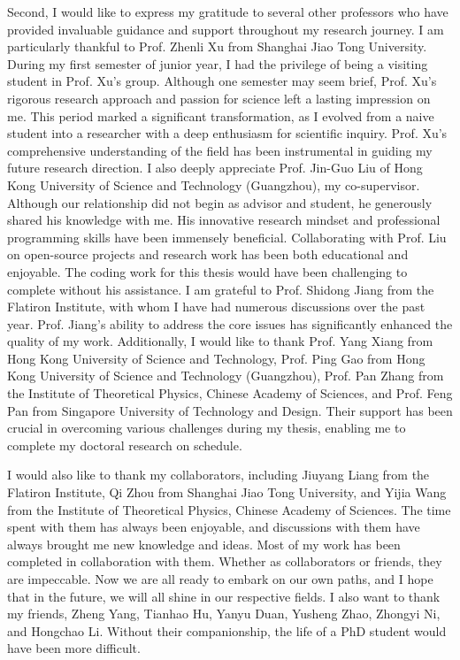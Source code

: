 Second, I would like to express my gratitude to several other professors who have provided invaluable guidance and support throughout my research journey. 
I am particularly thankful to Prof. Zhenli Xu from Shanghai Jiao Tong University. 
During my first semester of junior year, I had the privilege of being a visiting student in Prof. Xu's group.
Although one semester may seem brief, Prof. Xu's rigorous research approach and passion for science left a lasting impression on me. 
This period marked a significant transformation, as I evolved from a naive student into a researcher with a deep enthusiasm for scientific inquiry. Prof. Xu's comprehensive understanding of the field has been instrumental in guiding my future research direction.
I also deeply appreciate Prof. Jin-Guo Liu of Hong Kong University of Science and Technology (Guangzhou), my co-supervisor. 
Although our relationship did not begin as advisor and student, he generously shared his knowledge with me. His innovative research mindset and professional programming skills have been immensely beneficial. 
Collaborating with Prof. Liu on open-source projects and research work has been both educational and enjoyable. The coding work for this thesis would have been challenging to complete without his assistance.
I am grateful to Prof. Shidong Jiang from the Flatiron Institute, with whom I have had numerous discussions over the past year. 
Prof. Jiang's ability to address the core issues has significantly enhanced the quality of my work.
Additionally, I would like to thank Prof. Yang Xiang from Hong Kong University of Science and Technology, Prof. Ping Gao from Hong Kong University of Science and Technology (Guangzhou), Prof. Pan Zhang from the Institute of Theoretical Physics, Chinese Academy of Sciences, and Prof. Feng Pan from Singapore University of Technology and Design. 
Their support has been crucial in overcoming various challenges during my thesis, enabling me to complete my doctoral research on schedule.

I would also like to thank my collaborators, including Jiuyang Liang from the Flatiron Institute, Qi Zhou from Shanghai Jiao Tong University, and Yijia Wang from the Institute of Theoretical Physics, Chinese Academy of Sciences. 
The time spent with them has always been enjoyable, and discussions with them have always brought me new knowledge and ideas. 
Most of my work has been completed in collaboration with them. 
Whether as collaborators or friends, they are impeccable. 
Now we are all ready to embark on our own paths, and I hope that in the future, we will all shine in our respective fields.
I also want to thank my friends, Zheng Yang, Tianhao Hu, Yanyu Duan, Yusheng Zhao, Zhongyi Ni, and Hongchao Li. 
Without their companionship, the life of a PhD student would have been more difficult.

